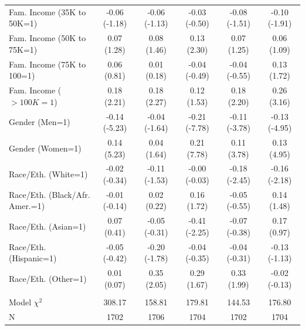 \documentclass[11pt]{article}
\begin{document}
\begin{landscape}
\begin{table}[t]
\begin{tabular*}{\hsize}{@{\extracolsep{\fill}} l*{5}{c}}
Fam. Income (35K to 50K=1)   &-0.06 (-1.18)&-0.06 (-1.13)&-0.03 (-0.50)&-0.08 (-1.51)&-0.10 (-1.91)\\
Fam. Income (50K to 75K=1)   &0.07 (1.28)&0.08 (1.46)&0.13 (2.30)&0.07 (1.25)&0.06 (1.09)\\
Fam. Income (75K to 100=1)   &0.06 (0.81)&0.01 (0.18)&-0.04 (-0.49)&-0.04 (-0.55)&0.13 (1.72)\\
Fam. Income ($>100K=1$)         &0.18 (2.21)&0.18 (2.27)&0.12 (1.53)&0.18 (2.20)&0.26 (3.16)\\
Gender (Men=1)                &-0.14 (-5.23)&-0.04 (-1.64)&-0.21 (-7.78)&-0.11 (-3.78)&-0.13 (-4.95)\\
Gender (Women=1)              &0.14 (5.23)&0.04 (1.64)&0.21 (7.78)&0.11 (3.78)&0.13 (4.95)\\
Race/Eth. (White=1)           &-0.02 (-0.34)&-0.11 (-1.53)&-0.00 (-0.03)&-0.18 (-2.45)&-0.16 (-2.18)\\
Race/Eth. (Black/Afr. Amer.=1)&-0.01 (-0.14)&0.02 (0.22)&0.16 (1.72)&-0.05 (-0.55)&0.14 (1.48)\\
Race/Eth. (Asian=1)           &0.07 (0.41)&-0.05 (-0.31)&-0.41 (-2.25)&-0.07 (-0.38)&0.17 (0.97)\\
Race/Eth. (Hispanic=1)        &-0.05 (-0.42)&-0.20 (-1.78)&-0.04 (-0.35)&-0.04 (-0.31)&-0.13 (-1.13)\\
Race/Eth. (Other=1)           &0.01 (0.07)&0.35 (2.05)&0.29 (1.67)&0.33 (1.99)&-0.02 (-0.13)\\ \\
Model $\chi^{2}$&308.17&   158.81&   179.81&   144.53&   176.80\\
N&     1702&     1706&     1704&     1702&     1704\\
\hline
\end{tabular*}
\label{tab2a}
\end{table}
\end{landscape}
\end{document}
